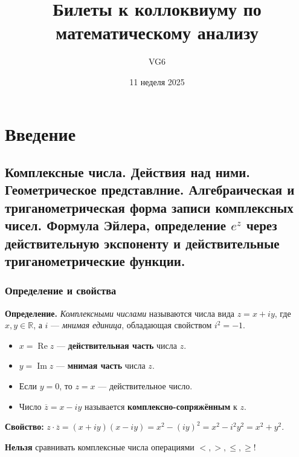 \documentclass[12pt, a4paper]{article}
\title{Билеты к коллоквиуму по математическому анализу}
\author{VG6}
\date{11 неделя 2025}
\newcommand{\R}{\mathbb{R}}
\begin{document}
\maketitle
\tableofcontents
\newpage

\section{Введение}
\subsection{Комплексные числа. Действия над ними. Геометрическое представлние. Алгебраическая и триганометрическая форма записи комплексных чисел. Формула Эйлера, определение $e^z$ через действительную экспоненту и действительные триганометрические функции.}

\subsubsection{Определение и свойства}
\begin{tcolorbox}
\textbf{Определение.} \textit{Комплексными числами} называются числа вида $z = x + iy$, где $x, y \in \R$, а $i$ — \textit{мнимая единица}, обладающая свойством $i^2 = -1$.
\end{tcolorbox}
\begin{itemize}
    \item $x = \operatorname{Re } z$ — \textbf{действительная часть} числа $z$.
    \item $y = \operatorname{Im } z$ — \textbf{мнимая часть} числа $z$.
    \item Если $y = 0$, то $z = x$ — действительное число.
    \item Число $\overline{z} = x - iy$ называется \textbf{комплексно-сопряжённым} к $z$.
\end{itemize}

\begin{tcolorbox}
\textbf{Свойство:} $z \cdot \overline{z} = (x + iy)(x - iy) = x^2 - (iy)^2 = x^2 - i^2y^2 = x^2 + y^2$.
\end{tcolorbox}

\begin{tcolorbox}[title=Важное примечание]
\textbf{Нельзя} сравнивать комплексные числа операциями $<, >, \leq, \geq$!
\end{tcolorbox}
\end{document}
